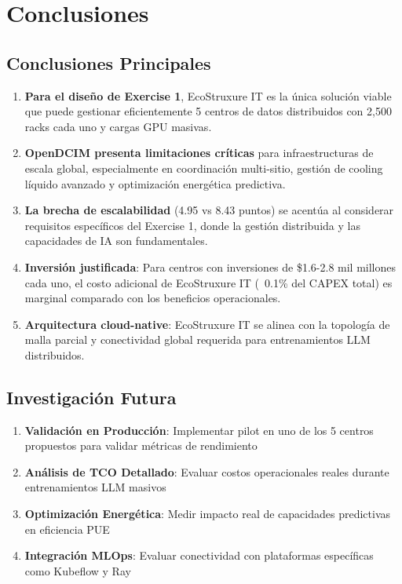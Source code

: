 \documentclass[12pt,a4paper]{article}
\begin{document}
\section{Conclusiones}

\subsection{Conclusiones Principales}

\begin{enumerate}
    \item \textbf{Para el diseño de Exercise 1}, EcoStruxure IT es la única solución viable que puede gestionar eficientemente 5 centros de datos distribuidos con 2,500 racks cada uno y cargas GPU masivas.

    \item \textbf{OpenDCIM presenta limitaciones críticas} para infraestructuras de escala global, especialmente en coordinación multi-sitio, gestión de cooling líquido avanzado y optimización energética predictiva.

    \item \textbf{La brecha de escalabilidad} (4.95 vs 8.43 puntos) se acentúa al considerar requisitos específicos del Exercise 1, donde la gestión distribuida y las capacidades de IA son fundamentales.

    \item \textbf{Inversión justificada}: Para centros con inversiones de \$1.6-2.8 mil millones cada uno, el costo adicional de EcoStruxure IT (~0.1\% del CAPEX total) es marginal comparado con los beneficios operacionales.

    \item \textbf{Arquitectura cloud-native}: EcoStruxure IT se alinea con la topología de malla parcial y conectividad global requerida para entrenamientos LLM distribuidos.
\end{enumerate}

\subsection{Investigación Futura}

\begin{enumerate}
    \item \textbf{Validación en Producción}: Implementar pilot en uno de los 5 centros propuestos para validar métricas de rendimiento
    \item \textbf{Análisis de TCO Detallado}: Evaluar costos operacionales reales durante entrenamientos LLM masivos
    \item \textbf{Optimización Energética}: Medir impacto real de capacidades predictivas en eficiencia PUE
    \item \textbf{Integración MLOps}: Evaluar conectividad con plataformas específicas como Kubeflow y Ray
\end{enumerate}
\end{document}
